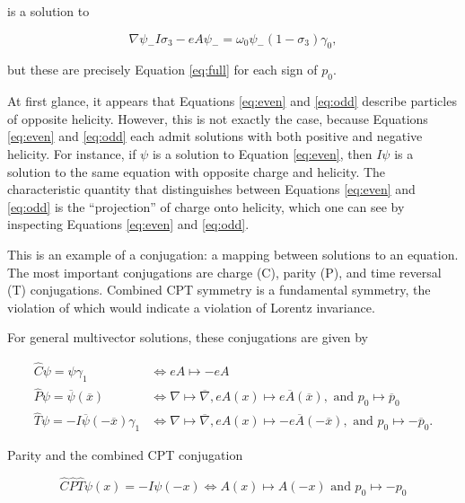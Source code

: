 \documentclass{article}
\begin{document}
  is a solution to

  \begin{equation}
    \nabla \psi_- I \sigma_3 - e A \psi_- = \omega_0 \psi_- (1 - \sigma_3) \gamma_0,\label{eq:odd}
  \end{equation}

  but these are precisely Equation \ref{eq:full} for each sign of $p_0$.

  At first glance, it appears that Equations \ref{eq:even} and \ref{eq:odd} describe particles of opposite helicity. However, this is not exactly the case, because Equations \ref{eq:even} and \ref{eq:odd} each admit solutions with both positive and negative helicity. For instance, if $\psi$ is a solution to Equation \ref{eq:even}, then $I \psi$ is a solution to the same equation with opposite charge and helicity. The characteristic quantity that distinguishes between Equations \ref{eq:even} and \ref{eq:odd} is the ``projection'' of charge onto helicity, which one can see by inspecting Equations \ref{eq:even} and \ref{eq:odd}.

  This is an example of a conjugation: a mapping between solutions to an equation. The most important conjugations are charge (C), parity (P), and time reversal (T) conjugations. Combined CPT symmetry is a fundamental symmetry, the violation of which would indicate a violation of Lorentz invariance.

  For general multivector solutions, these conjugations are given by

  \begin{align}
    \hat C \psi = \psi \gamma_1 &\iff eA \mapsto - eA \label{eq:charge}\\
    \hat P \psi = \overline \psi(\overline x) &\iff \nabla \mapsto \overline \nabla, eA(x) \mapsto e\overline A(\overline x), \text{ and } p_0 \mapsto \overline p_0 \label{eq:parity}\\
    \hat T \psi = -I \overline \psi(-\overline x) \gamma_1 &\iff \nabla \mapsto \overline\nabla, eA(x) \mapsto -e\overline A(-\overline x), \text{ and } p_0 \mapsto - \overline p_0.\label{eq:time}
  \end{align}

  Parity and the combined CPT conjugation

  \begin{equation}
    \hat C \hat P \hat T \psi(x) = -I \psi(-x) \iff A(x) \mapsto A(-x) \text{ and } p_0 \mapsto -p_0 \label{eq:cpt}
  \end{equation}
\end{document}
